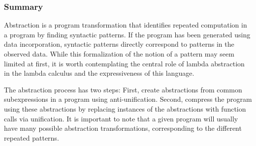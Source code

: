 \documentclass[a4paper,10pt]{article}
\begin{document}
\subsubsection{Summary}

Abstraction is a program transformation that identifies repeated computation in a program by finding syntactic patterns. If the program has been generated using data incorporation, syntactic patterns directly correspond to patterns in the observed data. While this formalization of the notion of a pattern may seem limited at first, it is worth contemplating the central role of lambda abstraction in the lambda calculus and the expressiveness of this language.

The abstraction process has two steps: First, create abstractions from common subexpressions in a program using anti-unification. Second, compress the program using these abstractions by replacing instances of the abstractions with function calls via unification.
It is important to note that a given program will usually have many possible abstraction transformations, corresponding to the different repeated patterns.
\end{document}
